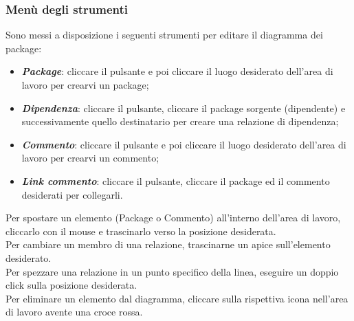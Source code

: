 \documentclass[../ManualeUtente.tex]{subfiles}
\begin{document}
			\subsubsection{Menù degli strumenti}
				Sono messi a disposizione i seguenti strumenti per editare il diagramma dei package:
				\begin{itemize}
					\item \textit{\textbf{Package}}: cliccare il pulsante e poi cliccare il luogo desiderato
					dell'area di lavoro per crearvi un package;
					\item \textit{\textbf{Dipendenza}}: cliccare il pulsante, cliccare il package sorgente
					(dipendente) e successivamente quello destinatario per creare una relazione di dipendenza;
					\item \textit{\textbf{Commento}}: cliccare il pulsante e poi cliccare il luogo desiderato
					dell'area di lavoro per crearvi un commento;
					\item \textit{\textbf{Link commento}}: cliccare il pulsante, cliccare il package ed il
					commento desiderati per collegarli.
				\end{itemize}
				Per spostare un elemento (Package o Commento) all'interno dell'area di lavoro, cliccarlo con
				il mouse e trascinarlo verso la posizione desiderata.\\
				Per cambiare un membro di una relazione, trascinarne un apice sull'elemento
				desiderato.\\
				Per spezzare una relazione in un punto specifico della linea, eseguire un doppio click sulla
				posizione desiderata.\\
				Per eliminare un elemento dal diagramma, cliccare sulla rispettiva icona nell'area di lavoro
				avente una croce rossa.
\end{document}
